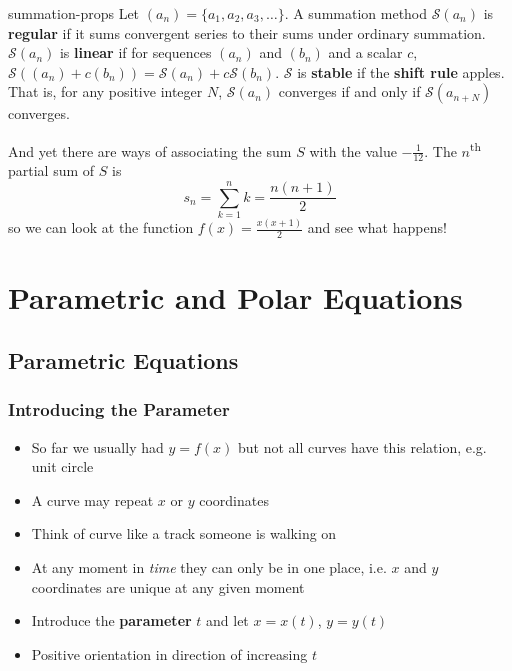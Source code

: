 \documentclass[letterpaper, 11pt, openany]{book}
\theoremstyle{mytheoremstyle}
\theoremstyle{myexamplestyle}
\begin{document}
\begin{definition}{}{summation-props}
    Let \((a_{n}) = \{a_{1}, a_{2}, a_{3},\ldots\}\). A summation method \(\mathcal{S}(a_{n})\) is \textbf{regular} if it sums convergent series to their sums under ordinary summation. \(\mathcal{S}(a_{n})\) is \textbf{linear} if for sequences \((a_{n})\) and \((b_{n})\) and a scalar \(c\), \(\mathcal{S}((a_{n}) + c(b_{n})) = \mathcal{S}(a_{n}) + c\mathcal{S}(b_{n})\). \(\mathcal{S}\) is \textbf{stable} if the \textbf{shift rule} apples. That is, for any positive integer \(N\), \(\mathcal{S}(a_{n})\) converges if and only if \(\mathcal{S}(a_{n+N})\) converges.
\end{definition}

And yet there are ways of associating the sum \(S\) with the value \(-\frac{1}{12}\). The \(n\)\textsuperscript{th} partial sum of \(S\) is
\[s_{n} = \sum_{k=1}^{n} k = \frac{n(n+1)}{2}\]
so we can look at the function \(f(x) = \frac{x(x+1)}{2}\) and see what happens!

\newpage\thispagestyle{firstofchapter}
\chapter{Parametric and Polar Equations}
\section{Parametric Equations}
\setcounter{figure}{0}
\subsection{Introducing the Parameter}

\begin{itemize}
    \item So far we usually had $y = f(x)$ but not all curves have this relation, e.g. unit circle
    \item A curve may repeat $x$ or $y$ coordinates
    \item Think of curve like a track someone is walking on
    \item At any moment in \textit{time} they can only be in one place, i.e. $x$ and $y$ coordinates are unique at any given moment
    \item Introduce the \textbf{parameter} $t$ and let $x = x(t)$, $y = y(t)$
    \item Positive orientation in direction of increasing $t$
\end{itemize}
\end{document}
